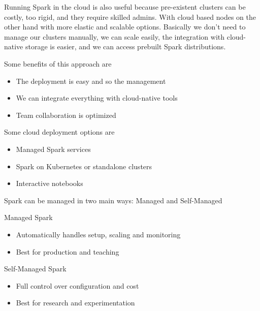\vspace{10pt}

Running Spark in the cloud is also useful because pre-existent clusters can be costly, too rigid, and they require skilled admins. With cloud based nodes on the other hand with more elastic and scalable options. Basically we don't need to manage our clusters manually, we can scale easily, the integration with cloud-native storage is easier, and we can access prebuilt Spark distributions.

\vspace{10pt}

Some benefits of this approach are

\begin{itemize}
    \item The deployment is easy and so the management
    \item We can integrate everything with cloud-native tools
    \item Team collaboration is optimized
\end{itemize}

Some cloud deployment options are

\begin{itemize}
    \item Managed Spark services
    \item Spark on Kubernetes or standalone clusters
    \item Interactive notebooks
\end{itemize}

Spark can be managed in two main ways: Managed and Self-Managed

\vspace{10pt}

Managed Spark

\begin{itemize}
    \item Automatically handles setup, scaling and monitoring
    \item Best for production and teaching
\end{itemize}

\vspace{10pt}

Self-Managed Spark

\begin{itemize}
    \item Full control over configuration and cost
    \item Best for research and experimentation
\end{itemize}

